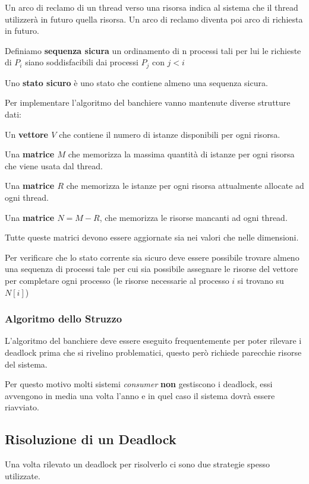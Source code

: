 Un arco di reclamo di un thread verso una risorsa indica al sistema che il thread utilizzerà in futuro quella risorsa. Un arco di reclamo diventa poi arco di richiesta in futuro.

\spacer
Definiamo \textbf{sequenza sicura} un ordinamento di n processi tali per lui le richieste di $P_i$ siano soddisfacibili dai processi $P_j$ con $j<i$

Uno \textbf{stato sicuro} è uno stato che contiene almeno una sequenza sicura.

\spacer
Per implementare l'algoritmo del banchiere vanno mantenute diverse strutture dati:
\begin{sitemize}
    \item Un \textbf{vettore $V$} che contiene il numero di istanze disponibili per ogni risorsa.
    \item Una \textbf{matrice $M$} che memorizza la massima quantità di istanze per ogni risorsa che viene usata dal thread.
    \item Una \textbf{matrice $R$} che memorizza le istanze per ogni risorsa attualmente allocate ad ogni thread.
    \item Una \textbf{matrice $N = M - R$}, che memorizza le risorse mancanti ad ogni thread.
\end{sitemize}

Tutte queste matrici devono essere aggiornate sia nei valori che nelle dimensioni.

\spacer
Per verificare che lo stato corrente sia sicuro deve essere possibile trovare almeno una sequenza di processi tale per cui sia possibile assegnare le risorse del vettore per completare ogni processo (le risorse necessarie al processo $i$ si trovano su $N[i]$)

\subsubsection{Algoritmo dello Struzzo}
L'algoritmo del banchiere deve essere eseguito frequentemente per poter rilevare i deadlock prima che si rivelino problematici, questo però richiede parecchie risorse del sistema.

\spacer
Per questo motivo molti sistemi \textit{consumer} \textbf{non} gestiscono i deadlock, essi avvengono in media una volta l'anno e in quel caso il sistema dovrà essere riavviato.

\subsection{Risoluzione di un Deadlock}
Una volta rilevato un deadlock per risolverlo ci sono due strategie spesso utilizzate.

